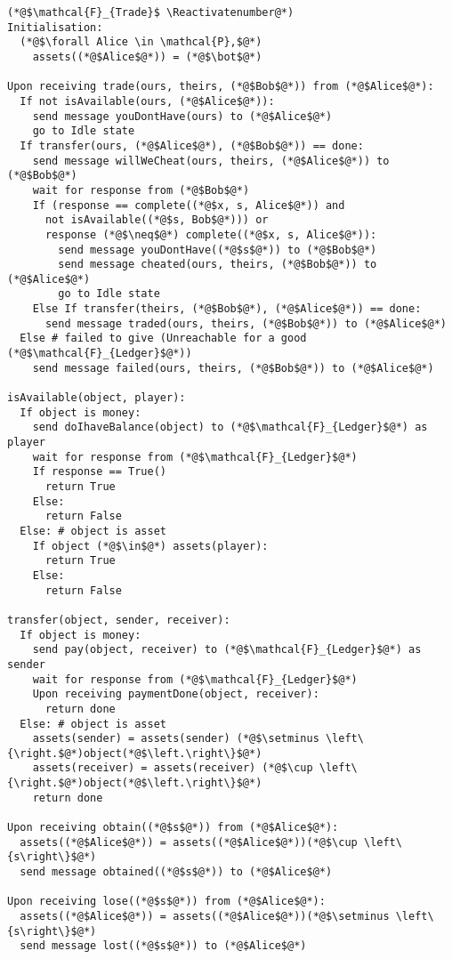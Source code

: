 \Suppressnumber
\begin{lstlisting}[label=tradefunc, style=numbers]
(*@$\mathcal{F}_{Trade}$ \Reactivatenumber@*)
Initialisation:
  (*@$\forall Alice \in \mathcal{P},$@*)
    assets((*@$Alice$@*)) = (*@$\bot$@*)

Upon receiving trade(ours, theirs, (*@$Bob$@*)) from (*@$Alice$@*):
  If not isAvailable(ours, (*@$Alice$@*)):
    send message youDontHave(ours) to (*@$Alice$@*)
    go to Idle state
  If transfer(ours, (*@$Alice$@*), (*@$Bob$@*)) == done:
    send message willWeCheat(ours, theirs, (*@$Alice$@*)) to (*@$Bob$@*)
    wait for response from (*@$Bob$@*)
    If (response == complete((*@$x, s, Alice$@*)) and
      not isAvailable((*@$s, Bob$@*))) or
      response (*@$\neq$@*) complete((*@$x, s, Alice$@*)):
        send message youDontHave((*@$s$@*)) to (*@$Bob$@*)
        send message cheated(ours, theirs, (*@$Bob$@*)) to (*@$Alice$@*)
        go to Idle state
    Else If transfer(theirs, (*@$Bob$@*), (*@$Alice$@*)) == done:
      send message traded(ours, theirs, (*@$Bob$@*)) to (*@$Alice$@*)
  Else # failed to give (Unreachable for a good (*@$\mathcal{F}_{Ledger}$@*))
    send message failed(ours, theirs, (*@$Bob$@*)) to (*@$Alice$@*)

isAvailable(object, player):
  If object is money:
    send doIhaveBalance(object) to (*@$\mathcal{F}_{Ledger}$@*) as player
    wait for response from (*@$\mathcal{F}_{Ledger}$@*)
    If response == True()
      return True
    Else:
      return False
  Else: # object is asset
    If object (*@$\in$@*) assets(player):
      return True
    Else:
      return False

transfer(object, sender, receiver):
  If object is money:
    send pay(object, receiver) to (*@$\mathcal{F}_{Ledger}$@*) as sender
    wait for response from (*@$\mathcal{F}_{Ledger}$@*)
    Upon receiving paymentDone(object, receiver):
      return done
  Else: # object is asset
    assets(sender) = assets(sender) (*@$\setminus \left\{\right.$@*)object(*@$\left.\right\}$@*)
    assets(receiver) = assets(receiver) (*@$\cup \left\{\right.$@*)object(*@$\left.\right\}$@*)
    return done

Upon receiving obtain((*@$s$@*)) from (*@$Alice$@*):
  assets((*@$Alice$@*)) = assets((*@$Alice$@*))(*@$\cup \left\{s\right\}$@*)
  send message obtained((*@$s$@*)) to (*@$Alice$@*)

Upon receiving lose((*@$s$@*)) from (*@$Alice$@*):
  assets((*@$Alice$@*)) = assets((*@$Alice$@*))(*@$\setminus \left\{s\right\}$@*)
  send message lost((*@$s$@*)) to (*@$Alice$@*)
\end{lstlisting}
